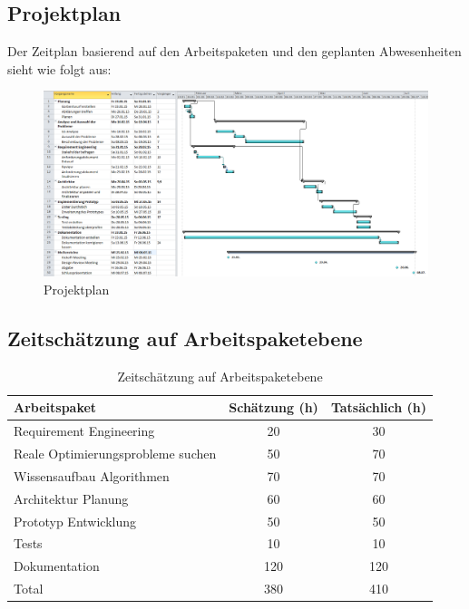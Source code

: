 \begin{landscape}
\thispagestyle{empty}
\subsection{Projektplan}\label{projektplan}
Der Zeitplan basierend auf den Arbeitspaketen und den geplanten Abwesenheiten sieht wie folgt aus:
\begin{figure}[h]
\centering
\includegraphics[scale=0.5]{images/project/projectplan.png}
\caption[Projektplan]{Projektplan \selfmade{}}
\label{fig:psp}
\end{figure}

\end{landscape}

\subsection{Zeitschätzung auf Arbeitspaketebene}
\begin{table}[ht]
\centering
  \begin{tabular}{ l | c | c }
	\hline
	\rowcolor{gray}
	\textbf{Arbeitspaket}					&	\textbf{Schätzung (h)}	& \textbf{Tatsächlich (h)}	\\ \hline
	Requirement Engineering					&	20			& 30	\\ \hline
	Reale Optimierungsprobleme suchen			&	50			& 70	\\ \hline
	Wissensaufbau Algorithmen				&	70			& 70	\\ \hline
	Architektur Planung						&	60			& 60	\\ \hline
	Prototyp Entwicklung					&	50			& 50	\\ \hline
	Tests								&	10			& 10	\\ \hline
	Dokumentation						&	120			& 120	\\ \hline \hline
	Total								&	380			& 410	\\ \hline
  \end{tabular}
   \caption{Zeitschätzung auf Arbeitspaketebene}\label{table:time_estimation}
\end{table}
